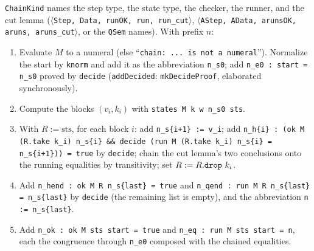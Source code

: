 \begin{algorithm}\label{alg:lean-pathsum-chain}
\textnormal{\texttt{ChainKind}} names the step type, the state type, the checker, the runner, and the cut lemma
(\textnormal{\texttt{\ensuremath{\langle}Step,\allowbreak{} Data,\allowbreak{} runOK,\allowbreak{} run,\allowbreak{} run\_\allowbreak{}cut\ensuremath{\rangle}}}, \textnormal{\texttt{\ensuremath{\langle}AStep,\allowbreak{} AData,\allowbreak{} arunsOK,\allowbreak{} aruns,\allowbreak{} aruns\_\allowbreak{}cut\ensuremath{\rangle}}}, or the
\textnormal{\texttt{QSem}} names). With prefix $n$:
\begin{enumerate}
\item Evaluate $M$ to a numeral (else ``\texttt{chain: ... is not a numeral}''). Normalize the start
  by \textnormal{\texttt{knorm}} and add it as the abbreviation \textnormal{\texttt{n\_\allowbreak{}s0}}; add \textnormal{\texttt{n\_\allowbreak{}e0 : start = n\_\allowbreak{}s0}} proved by
  \textnormal{\texttt{decide}} (\textnormal{\texttt{addDecided}}: \textnormal{\texttt{mkDecideProof}}, elaborated synchronously).
\item Compute the blocks $(v_i, k_i)$ with \textnormal{\texttt{states M k w n\_\allowbreak{}s0 sts}}.
\item With $R := \text{sts}$, for each block $i$: add \textnormal{\texttt{n\_\allowbreak{}s\{i+1\} := v\_\allowbreak{}i}}; add
  \textnormal{\texttt{n\_\allowbreak{}h\{i\} : (\allowbreak{}ok M (\allowbreak{}R.\allowbreak{}take k\_\allowbreak{}i) n\_\allowbreak{}s\{i\} \&\& decide (\allowbreak{}run M (\allowbreak{}R.\allowbreak{}take k\_\allowbreak{}i) n\_\allowbreak{}s\{i\} = n\_\allowbreak{}s\{i+1\})) = true}}
  by \textnormal{\texttt{decide}}; chain the cut lemma's two conclusions onto the running equalities by
  transitivity; set $R := R.\textnormal{\texttt{drop}}\ k_i$.
\item Add \textnormal{\texttt{n\_\allowbreak{}hend : ok M R n\_\allowbreak{}s\{last\} = true}} and \textnormal{\texttt{n\_\allowbreak{}qend : run M R n\_\allowbreak{}s\{last\} = n\_\allowbreak{}s\{last\}}}
  by \textnormal{\texttt{decide}} (the remaining list is empty), and the abbreviation \textnormal{\texttt{n := n\_\allowbreak{}s\{last\}}}.
\item Add \textnormal{\texttt{n\_\allowbreak{}ok : ok M sts start = true}} and \textnormal{\texttt{n\_\allowbreak{}eq : run M sts start = n}}, each the
  congruence through \textnormal{\texttt{n\_\allowbreak{}e0}} composed with the chained equalities.
\end{enumerate}
\end{algorithm}

